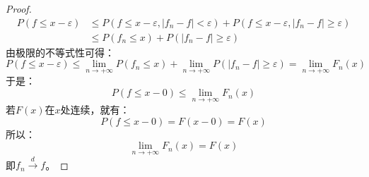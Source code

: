 \begin{proof}
	\begin{align*}
		P(f\leqslant x-\varepsilon)&\leqslant P(f\leqslant x-\varepsilon,|f_n-f|<\varepsilon)+P(f\leqslant x-\varepsilon,|f_n-f|\geqslant \varepsilon) \\
		&\leqslant P(f_n\leqslant x)+P(|f_n-f|\geqslant\varepsilon)
	\end{align*}
	由极限的不等式性可得：
	\begin{equation*}
		P(f\leqslant x-\varepsilon)\leqslant\lim_{n\to+\infty}P(f_n\leqslant x)+\lim_{n\to+\infty}P(|f_n-f|\geqslant\varepsilon)=\lim_{n\to+\infty}F_n(x)
	\end{equation*}
	于是：
	\begin{equation*}
		P(f\leqslant x-0)\leqslant\lim_{n\to+\infty}F_n(x)
	\end{equation*}
	若$F(x)$在$x$处连续，就有：
	\begin{equation*}
		P(f\leqslant x-0)=F(x-0)=F(x)
	\end{equation*}
	所以：
	\begin{equation}
		\lim_{n\to+\infty}F_n(x)=F(x)
	\end{equation}
	即$f_n\overset{d}{\longrightarrow}f$。
\end{proof}
